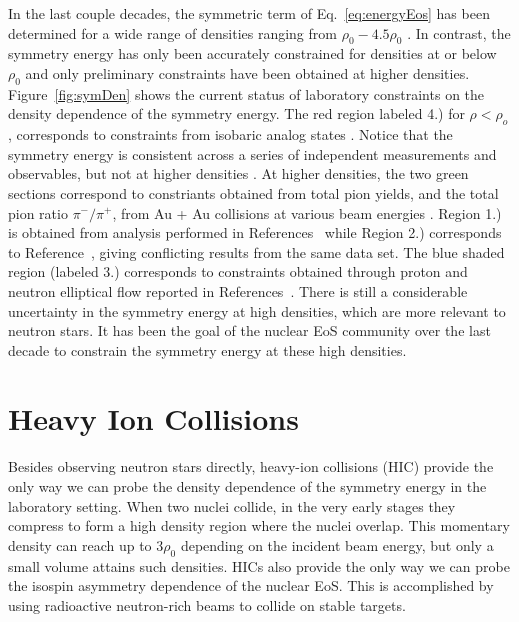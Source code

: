 In the last couple decades, the symmetric term of Eq.~\ref{eq:energyEos} has been determined for a wide range of densities ranging from $\rho_0 - 4.5\rho_0$ \cite{scienceEos}. In contrast, the symmetry energy has only been accurately constrained for densities at or below $\rho_0$ and only preliminary constraints have been obtained at higher densities. Figure~\ref{fig:symDen} shows the current status of laboratory constraints on the density dependence of the symmetry energy. The red region labeled 4.) for $\rho < \rho_o$, corresponds to constraints from isobaric analog states \cite{dan2014}. Notice that the symmetry energy is consistent across  a series of independent measurements and observables, but not at higher densities \cite{awayforward}. At higher densities, the two green sections correspond to constriants obtained from total pion yields, and the total pion ratio $\pi^-/\pi^+$, from Au + Au collisions at various beam energies \cite{fopi}. Region 1.) is obtained from analysis performed in References~\cite{xia2009,xie2013} while Region 2.) corresponds to Reference~\cite{feng2010}, giving conflicting results from the same data set. The blue shaded region (labeled 3.) corresponds to constraints obtained through proton and neutron elliptical flow reported in References~\cite{russo2016,cozma2016,cozma2017}. There is still a considerable uncertainty in the symmetry energy at high densities, which are more relevant to neutron stars. It has been the goal of the nuclear EoS community over the last decade to constrain the symmetry energy at these high densities. 




\section{Heavy Ion Collisions}
Besides observing neutron stars directly, heavy-ion collisions (HIC) provide the only way we can probe the density dependence of the symmetry energy in the laboratory setting. When two nuclei collide, in the very early stages they compress to form a high density region where the nuclei overlap. This momentary density can reach up to $3\rho_0$ depending on the incident beam energy, but only a small volume attains such densities.  HICs also provide the only way we can probe the isospin asymmetry dependence of the nuclear EoS. This is accomplished by using radioactive neutron-rich beams to collide on stable targets. 


